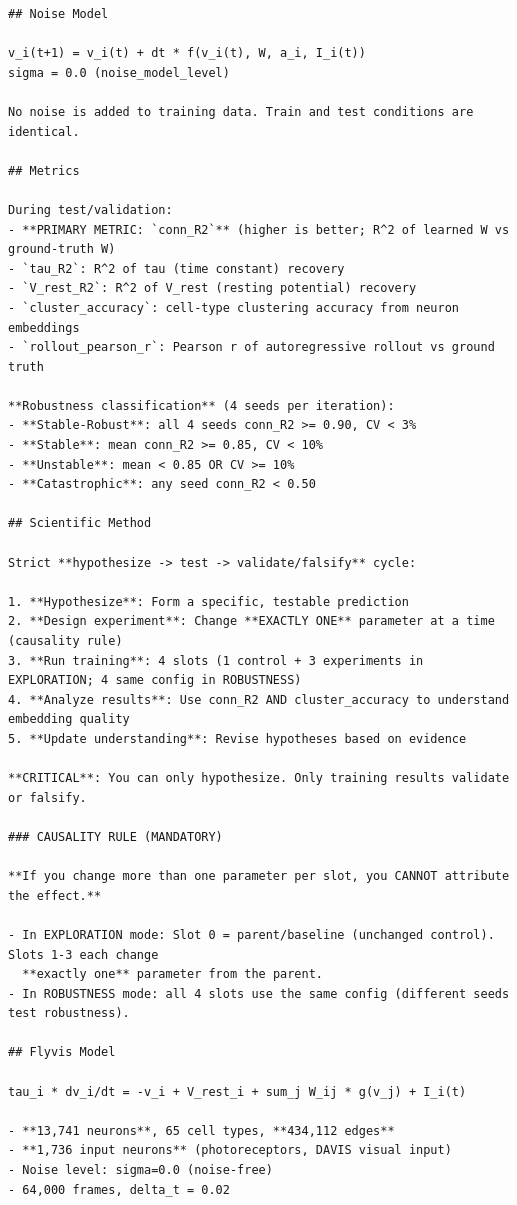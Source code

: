 \documentclass{article}
\begin{document}
\begin{tiny}
\begin{verbatim}
## Noise Model

v_i(t+1) = v_i(t) + dt * f(v_i(t), W, a_i, I_i(t))
sigma = 0.0 (noise_model_level)

No noise is added to training data. Train and test conditions are identical.

## Metrics

During test/validation:
- **PRIMARY METRIC: `conn_R2`** (higher is better; R^2 of learned W vs ground-truth W)
- `tau_R2`: R^2 of tau (time constant) recovery
- `V_rest_R2`: R^2 of V_rest (resting potential) recovery
- `cluster_accuracy`: cell-type clustering accuracy from neuron embeddings
- `rollout_pearson_r`: Pearson r of autoregressive rollout vs ground truth

**Robustness classification** (4 seeds per iteration):
- **Stable-Robust**: all 4 seeds conn_R2 >= 0.90, CV < 3%
- **Stable**: mean conn_R2 >= 0.85, CV < 10%
- **Unstable**: mean < 0.85 OR CV >= 10%
- **Catastrophic**: any seed conn_R2 < 0.50

## Scientific Method

Strict **hypothesize -> test -> validate/falsify** cycle:

1. **Hypothesize**: Form a specific, testable prediction
2. **Design experiment**: Change **EXACTLY ONE** parameter at a time (causality rule)
3. **Run training**: 4 slots (1 control + 3 experiments in EXPLORATION; 4 same config in ROBUSTNESS)
4. **Analyze results**: Use conn_R2 AND cluster_accuracy to understand embedding quality
5. **Update understanding**: Revise hypotheses based on evidence

**CRITICAL**: You can only hypothesize. Only training results validate or falsify.

### CAUSALITY RULE (MANDATORY)

**If you change more than one parameter per slot, you CANNOT attribute the effect.**

- In EXPLORATION mode: Slot 0 = parent/baseline (unchanged control). Slots 1-3 each change
  **exactly one** parameter from the parent.
- In ROBUSTNESS mode: all 4 slots use the same config (different seeds test robustness).

## Flyvis Model

tau_i * dv_i/dt = -v_i + V_rest_i + sum_j W_ij * g(v_j) + I_i(t)

- **13,741 neurons**, 65 cell types, **434,112 edges**
- **1,736 input neurons** (photoreceptors, DAVIS visual input)
- Noise level: sigma=0.0 (noise-free)
- 64,000 frames, delta_t = 0.02


\end{verbatim}
\end{tiny}
\end{document}
